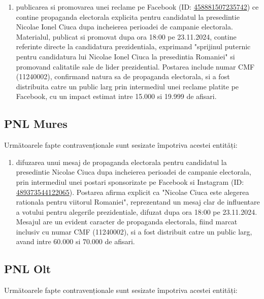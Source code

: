 \documentclass[a4paper,12pt]{article}
\begin{document}
\begin{enumerate}[leftmargin=*, label=\arabic*.)]
    \item publicarea si promovarea unei reclame pe Facebook (ID: \href{https://www.facebook.com/ads/library/?id=458881507235742}{458881507235742}) ce contine propaganda electorala explicita pentru candidatul la presedintie Nicolae Ionel Ciuca dupa incheierea perioadei de campanie electorala. Materialul, publicat si promovat dupa ora 18:00 pe 23.11.2024, contine referinte directe la candidatura prezidentiala, exprimand "sprijinul puternic pentru candidatura lui Nicolae Ionel Ciuca la presedintia Romaniei" si promovand calitatile sale de lider prezidential. Postarea include numar CMF (11240002), confirmand natura sa de propaganda electorala, si a fost distribuita catre un public larg prin intermediul unei reclame platite pe Facebook, cu un impact estimat intre 15.000 si 19.999 de afisari.
\end{enumerate}

\vspace{0.5cm}

\subsection{PNL Mures}
Următoarele fapte contravenționale sunt sesizate împotriva acestei entități:

\begin{enumerate}[leftmargin=*, label=\arabic*.)]
    \item difuzarea unui mesaj de propaganda electorala pentru candidatul la presedintie Nicolae Ciuca dupa incheierea perioadei de campanie electorala, prin intermediul unei postari sponsorizate pe Facebook si Instagram (ID: \href{https://www.facebook.com/ads/library/?id=489373544122065}{489373544122065}). Postarea afirma explicit ca "Nicolae Ciuca este alegerea rationala pentru viitorul Romaniei", reprezentand un mesaj clar de influentare a votului pentru alegerile prezidentiale, difuzat dupa ora 18:00 pe 23.11.2024. Mesajul are un evident caracter de propaganda electorala, fiind marcat inclusiv cu numar CMF (11240002), si a fost distribuit catre un public larg, avand intre 60.000 si 70.000 de afisari.
\end{enumerate}

\vspace{0.5cm}

\subsection{PNL Olt}
Următoarele fapte contravenționale sunt sesizate împotriva acestei entități:
\end{document}
